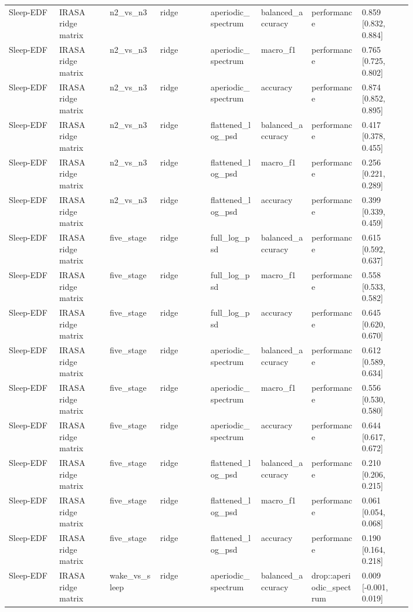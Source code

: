 \begin{longtable}{p{0.10\linewidth}p{0.10\linewidth}p{0.10\linewidth}p{0.10\linewidth}p{0.10\linewidth}p{0.10\linewidth}p{0.10\linewidth}p{0.10\linewidth}}
Sleep-EDF & IRASA ridge matrix & n2\_vs\_n3 & ridge & aperiodic\_spectrum & balanced\_accuracy & performance & 0.859 [0.832, 0.884]\\
Sleep-EDF & IRASA ridge matrix & n2\_vs\_n3 & ridge & aperiodic\_spectrum & macro\_f1 & performance & 0.765 [0.725, 0.802]\\
Sleep-EDF & IRASA ridge matrix & n2\_vs\_n3 & ridge & aperiodic\_spectrum & accuracy & performance & 0.874 [0.852, 0.895]\\
Sleep-EDF & IRASA ridge matrix & n2\_vs\_n3 & ridge & flattened\_log\_psd & balanced\_accuracy & performance & 0.417 [0.378, 0.455]\\
Sleep-EDF & IRASA ridge matrix & n2\_vs\_n3 & ridge & flattened\_log\_psd & macro\_f1 & performance & 0.256 [0.221, 0.289]\\
Sleep-EDF & IRASA ridge matrix & n2\_vs\_n3 & ridge & flattened\_log\_psd & accuracy & performance & 0.399 [0.339, 0.459]\\
Sleep-EDF & IRASA ridge matrix & five\_stage & ridge & full\_log\_psd & balanced\_accuracy & performance & 0.615 [0.592, 0.637]\\
Sleep-EDF & IRASA ridge matrix & five\_stage & ridge & full\_log\_psd & macro\_f1 & performance & 0.558 [0.533, 0.582]\\
Sleep-EDF & IRASA ridge matrix & five\_stage & ridge & full\_log\_psd & accuracy & performance & 0.645 [0.620, 0.670]\\
Sleep-EDF & IRASA ridge matrix & five\_stage & ridge & aperiodic\_spectrum & balanced\_accuracy & performance & 0.612 [0.589, 0.634]\\
Sleep-EDF & IRASA ridge matrix & five\_stage & ridge & aperiodic\_spectrum & macro\_f1 & performance & 0.556 [0.530, 0.580]\\
Sleep-EDF & IRASA ridge matrix & five\_stage & ridge & aperiodic\_spectrum & accuracy & performance & 0.644 [0.617, 0.672]\\
Sleep-EDF & IRASA ridge matrix & five\_stage & ridge & flattened\_log\_psd & balanced\_accuracy & performance & 0.210 [0.206, 0.215]\\
Sleep-EDF & IRASA ridge matrix & five\_stage & ridge & flattened\_log\_psd & macro\_f1 & performance & 0.061 [0.054, 0.068]\\
Sleep-EDF & IRASA ridge matrix & five\_stage & ridge & flattened\_log\_psd & accuracy & performance & 0.190 [0.164, 0.218]\\
Sleep-EDF & IRASA ridge matrix & wake\_vs\_sleep & ridge & aperiodic\_spectrum & balanced\_accuracy & drop::aperiodic\_spectrum & 0.009 [-0.001, 0.019]\\

\end{longtable}

